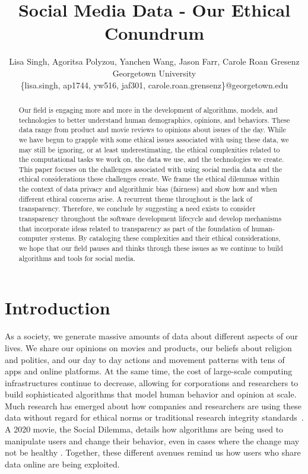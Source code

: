 \documentclass[11pt]{article} %
\begin{document}
\title{Social Media Data - Our Ethical Conundrum}


\author{Lisa Singh, Agoritsa Polyzou, Yanchen Wang, Jason Farr, Carole Roan Gresenz\\Georgetown University\\ \{lisa.singh, ap1744, yw516, jaf301, carole.roan.grensenz\}@georgetown.edu}


\maketitle
\begin{abstract}
Our field is engaging more and more in the development of algorithms, models, and technologies to better understand human demographics, opinions, and behaviors. These data range from product and movie reviews to opinions about issues of the day. While we have begun to grapple with some ethical issues associated with using these data, we may still be ignoring, or at least underestimating, the ethical complexities related to the computational tasks we work on, the data we use, and the technologies we create. This paper focuses on the challenges associated with using social media data and the ethical considerations these challenges create. We frame the ethical dilemmas within the context of data privacy and algorithmic bias (fairness) and show how and when different ethical concerns arise. A recurrent theme throughout is the lack of transparency. Therefore, we conclude by suggesting a need exists to consider transparency throughout the software development lifecycle and develop mechanisms that incorporate ideas related to transparency as part of the foundation of human-computer systems. By cataloging these complexities and their ethical considerations, we hope that our field pauses and thinks through these issues as we continue to build algorithms and tools for social media. 

\end{abstract}

\section{Introduction}
\label{intro}
As a society, we generate massive amounts of data about different aspects of our lives. We share our opinions on movies and products, our beliefs about religion and politics, and our day to day actions and movement patterns with tens of apps and online platforms. At the same time, the cost of large-scale computing infrastructures continue to decrease, allowing for corporations and researchers to build sophisticated algorithms that model human behavior and opinion at scale. Much research has emerged about how companies and researchers are using these data without regard for ethical norms or traditional research integrity standards~\cite{Kramer8788,10.1177/1747016117738559,samuel2019}. A 2020 movie, the Social Dilemma, details how algorithms are being used to manipulate users and change their behavior, even in cases where the change may not be healthy \cite{socialdilemma}. Together, these different avenues remind us how users who share data online are being exploited. 
\end{document}
